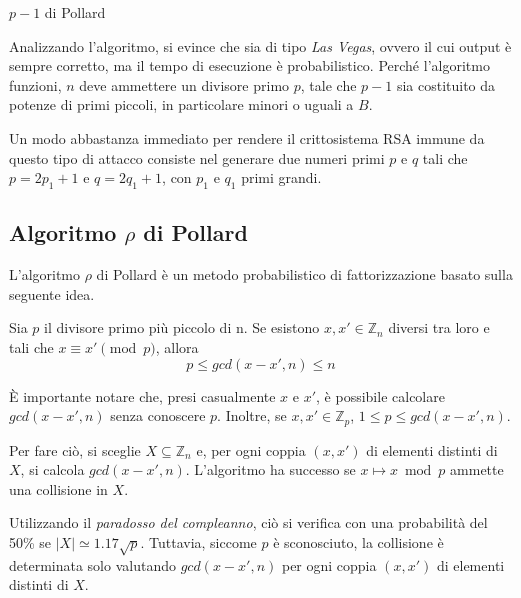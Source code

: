 \begin{algorithm}[H]
	\caption{$p-1$ di Pollard}
	\label{alg:pollardP1}
	\DontPrintSemicolon
\end{algorithm}

Analizzando l'algoritmo, si evince che sia di tipo \emph{Las Vegas}, ovvero il cui output è sempre corretto, ma il tempo di esecuzione è probabilistico. Perché l'algoritmo funzioni, $n$ deve ammettere un divisore primo $p$, tale che $p-1$ sia costituito da potenze di primi piccoli, in particolare minori o uguali a $B$.

Un modo abbastanza immediato per rendere il crittosistema RSA immune da questo tipo di attacco consiste nel generare due numeri primi $p$ e $q$ tali che $p = 2p_1 + 1$ e $q = 2q_1 + 1$, con $p_1$ e $q_1$ primi grandi.

%
\subsection{Algoritmo $\rho$ di Pollard}
%

L'algoritmo $\rho$ di Pollard è un metodo probabilistico di fattorizzazione basato sulla seguente idea.

Sia $p$ il divisore primo più piccolo di n. Se esistono $x, x' \in \mathbb{Z}_n$ diversi tra loro e tali che $x \equiv x' \pmod{p}$, allora \[ p \leq gcd(x-x', n) \leq n \]

È importante notare che, presi casualmente $x$ e $x'$, è possibile calcolare $gcd(x-x', n)$ senza conoscere $p$. Inoltre, se $x, x' \in \mathbb{Z}_p$, $1 \leq p \leq gcd(x-x', n)$.

Per fare ciò, si sceglie $X \subseteq \mathbb{Z}_n$ e, per ogni coppia $\left( x, x' \right)$ di elementi distinti di $X$, si calcola $gcd(x-x', n)$. L'algoritmo ha successo se $x \mapsto x \bmod p$ ammette una collisione in $X$.

Utilizzando il \emph{paradosso del compleanno}, ciò si verifica con una probabilità del 50\% se $|X| \simeq 1.17\sqrt{p}$. Tuttavia, siccome $p$ è sconosciuto, la collisione è determinata solo valutando $gcd(x-x', n)$ per ogni coppia $\left( x, x' \right)$ di elementi distinti di $X$.

